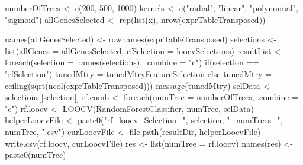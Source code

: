 \documentclass[]{article}
\newenvironment{Shaded}{\begin{snugshade}}{\end{snugshade}}
\newcommand{\ControlFlowTok}[1]{\textcolor[rgb]{0.94,0.87,0.69}{#1}}
\newcommand{\DataTypeTok}[1]{\textcolor[rgb]{0.87,0.87,0.75}{#1}}
\newcommand{\DecValTok}[1]{\textcolor[rgb]{0.86,0.86,0.80}{#1}}
\newcommand{\KeywordTok}[1]{\textcolor[rgb]{0.94,0.87,0.69}{#1}}
\newcommand{\NormalTok}[1]{\textcolor[rgb]{0.80,0.80,0.80}{#1}}
\newcommand{\OperatorTok}[1]{\textcolor[rgb]{0.94,0.94,0.82}{#1}}
\newcommand{\StringTok}[1]{\textcolor[rgb]{0.80,0.58,0.58}{#1}}
\begin{document}
\begin{Shaded}
\begin{Highlighting}[]
\NormalTok{numberOfTrees <-}\StringTok{ }\KeywordTok{c}\NormalTok{(}\DecValTok{200}\NormalTok{, }\DecValTok{500}\NormalTok{, }\DecValTok{1000}\NormalTok{)}
\NormalTok{kernels <-}\StringTok{ }\KeywordTok{c}\NormalTok{(}\StringTok{"radial"}\NormalTok{, }\StringTok{"linear"}\NormalTok{, }\StringTok{"polynomial"}\NormalTok{, }\StringTok{"sigmoid"}\NormalTok{)}
\NormalTok{allGenesSelected <-}\StringTok{ }\KeywordTok{rep}\NormalTok{(}\KeywordTok{list}\NormalTok{(x), }\KeywordTok{nrow}\NormalTok{(exprTableTransposed))}

\KeywordTok{names}\NormalTok{(allGenesSelected) <-}\StringTok{ }\KeywordTok{rownames}\NormalTok{(exprTableTransposed)}
\NormalTok{selections <-}\StringTok{ }\KeywordTok{list}\NormalTok{(}\DataTypeTok{allGenes =}\NormalTok{ allGenesSelected,}
                   \DataTypeTok{rfSelection =}\NormalTok{ loocvSelections)}
\NormalTok{resultList <-}\StringTok{ }\KeywordTok{foreach}\NormalTok{(}\DataTypeTok{selection =} \KeywordTok{names}\NormalTok{(selections), }\DataTypeTok{.combine =} \StringTok{"c"}\NormalTok{) }\OperatorTok{%do%}\StringTok{ }\NormalTok{\{}
    \ControlFlowTok{if}\NormalTok{(selection }\OperatorTok{==}\StringTok{ "rfSelection"}\NormalTok{) tunedMtry =}\StringTok{ }\NormalTok{tunedMtryFeatureSelection }\ControlFlowTok{else}\NormalTok{ tunedMtry =}\StringTok{ }\KeywordTok{ceiling}\NormalTok{(}\KeywordTok{sqrt}\NormalTok{(}\KeywordTok{ncol}\NormalTok{(exprTableTransposed)))}
    \KeywordTok{message}\NormalTok{(tunedMtry)}
\NormalTok{    selData <-}\StringTok{ }\NormalTok{selections[[selection]]}
\NormalTok{    rf.comb <-}\StringTok{ }\KeywordTok{foreach}\NormalTok{(}\DataTypeTok{numTree =}\NormalTok{ numberOfTrees, }\DataTypeTok{.combine =} \StringTok{"c"}\NormalTok{) }\OperatorTok{%do%}\StringTok{ }\NormalTok{\{}
\NormalTok{        rf.loocv <-}\StringTok{ }\KeywordTok{LOOCV}\NormalTok{(RandomForestClassifier, numTree, selData)}
\NormalTok{        helperLoocvFile <-}\StringTok{ }\KeywordTok{paste0}\NormalTok{(}\StringTok{"rf_loocv_Selection_"}\NormalTok{, selection,}
                                  \StringTok{"_numTrees_"}\NormalTok{, numTree, }\StringTok{".csv"}\NormalTok{)}
\NormalTok{        curLoocvFile <-}\StringTok{ }\KeywordTok{file.path}\NormalTok{(resultDir, helperLoocvFile)}
        \KeywordTok{write.csv}\NormalTok{(rf.loocv, curLoocvFile)}
\NormalTok{        res <-}\StringTok{ }\KeywordTok{list}\NormalTok{(}\DataTypeTok{numTree =}\NormalTok{ rf.loocv)}
        \KeywordTok{names}\NormalTok{(res) <-}\StringTok{ }\KeywordTok{paste0}\NormalTok{(numTree)}
}}
\end{Highlighting}
\end{Shaded}
\end{document}
